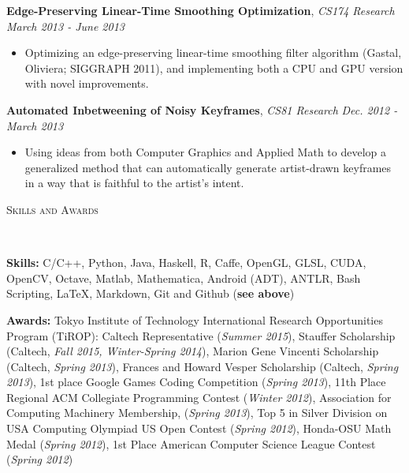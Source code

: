 \documentclass[9pt]{article}
\newenvironment{changemargin}[2]{%
  \begin{list}{}{%
    \setlength{\topsep}{0pt}%
    \setlength{\leftmargin}{#1}%
    \setlength{\rightmargin}{#2}%
    \setlength{\listparindent}{\parindent}%
    \setlength{\itemindent}{\parindent}%
    \setlength{\parsep}{\parskip}%
  }%
  \item[]}{\end{list}
}
\newcommand{\lineover}{
	\begin{changemargin}{-0.05in}{-0.05in}
		\vspace*{-8pt}
		\hrulefill \\
		\vspace*{-2pt}
	\end{changemargin}
}
\newcommand{\header}[1]{
	\begin{changemargin}{-0.5in}{-0.5in}
		\scshape{#1}\\
  	\lineover
	\end{changemargin}
}
\newenvironment{body} {
	\vspace*{-16pt}
	\begin{changemargin}{-0.25in}{-0.5in}
  }	
	{\end{changemargin}
}
\begin{document}
\begin{body}
\begin{itemize}
	\end{itemize}
	\textbf{Edge-Preserving Linear-Time Smoothing Optimization}, \emph{CS174 Research} \hfill \emph{March 2013 - June 2013} \\
		\vspace*{-3pt}
	\begin{itemize} \itemsep -0pt
		\item Optimizing an edge-preserving linear-time smoothing filter algorithm (Gastal, Oliviera; SIGGRAPH 2011), and implementing both a CPU and GPU version with novel improvements.
	\end{itemize}
	\textbf{Automated Inbetweening of Noisy Keyframes}, \emph{CS81 Research} \hfill \emph{Dec. 2012 - March 2013} \\
		\vspace*{-3pt}
	\begin{itemize} \itemsep -0pt
		\item Using ideas from both Computer Graphics and Applied Math to develop a generalized method that can automatically generate artist-drawn keyframes in a way that is faithful to the artist's intent.
	\end{itemize}

\end{body}

\smallskip

\header{Skills and Awards}
\smallskip
\begin{body}
	\vspace{18pt}
	
	\textbf{Skills:} C/C++, Python, Java, Haskell, R, Caffe, OpenGL, GLSL, CUDA, OpenCV, Octave, Matlab, Mathematica, Android (ADT), ANTLR, Bash Scripting, \LaTeX, Markdown, Git and Github (\textbf{see above})\\
	
	\medskip
	
	\textbf{Awards:} Tokyo Institute of Technology International Research Opportunities Program (TiROP): Caltech Representative (\emph{Summer 2015}), Stauffer Scholarship (Caltech, \emph{Fall 2015, Winter-Spring 2014}), Marion Gene Vincenti Scholarship (Caltech, \emph{Spring 2013}),
        Frances and Howard Vesper Scholarship (Caltech, \emph{Spring 2013}),
        1st place Google Games Coding Competition (\emph{Spring 2013}),
        11th Place Regional ACM Collegiate Programming Contest (\emph{Winter 2012}),
        Association for Computing Machinery Membership, (\emph{Spring 2013}),
        Top 5 in Silver Division on USA Computing Olympiad US Open Contest (\emph{Spring 2012}),
        Honda-OSU Math Medal (\emph{Spring 2012}),
        1st Place American Computer Science League Contest (\emph{Spring 2012})
	
	
%
\end{body}
\end{document}
